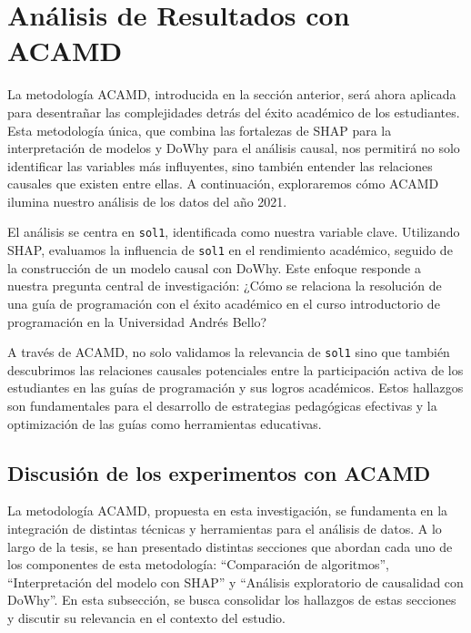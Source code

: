 \section{Análisis de Resultados con ACAMD}\label{analisis_resultados_acamd}
La metodología ACAMD, introducida en la sección anterior, será ahora aplicada para desentrañar las complejidades detrás del éxito académico de los estudiantes. Esta metodología única, que combina las fortalezas de SHAP para la interpretación de modelos y DoWhy para el análisis causal, nos permitirá no solo identificar las variables más influyentes, sino también entender las relaciones causales que existen entre ellas. A continuación, exploraremos cómo ACAMD ilumina nuestro análisis de los datos del año 2021.

El análisis se centra en \texttt{sol1}, identificada como nuestra variable clave. Utilizando SHAP, evaluamos la influencia de \texttt{sol1} en el rendimiento académico, seguido de la construcción de un modelo causal con DoWhy. Este enfoque responde a nuestra pregunta central de investigación: ¿Cómo se relaciona la resolución de una guía de programación con el éxito académico en el curso introductorio de programación en la Universidad Andrés Bello?

A través de ACAMD, no solo validamos la relevancia de \texttt{sol1} sino que también descubrimos las relaciones causales potenciales entre la participación activa de los estudiantes en las guías de programación y sus logros académicos. Estos hallazgos son fundamentales para el desarrollo de estrategias pedagógicas efectivas y la optimización de las guías como herramientas educativas.











\subsection{Discusión de los experimentos con ACAMD}

La metodología ACAMD, propuesta en esta investigación, se fundamenta en la integración de distintas técnicas y herramientas para el análisis de datos. A lo largo de la tesis, se han presentado distintas secciones que abordan cada uno de los componentes de esta metodología: ``Comparación de algoritmos'', ``Interpretación del modelo con SHAP'' y ``Análisis exploratorio de causalidad con DoWhy''. En esta subsección, se busca consolidar los hallazgos de estas secciones y discutir su relevancia en el contexto del estudio.

